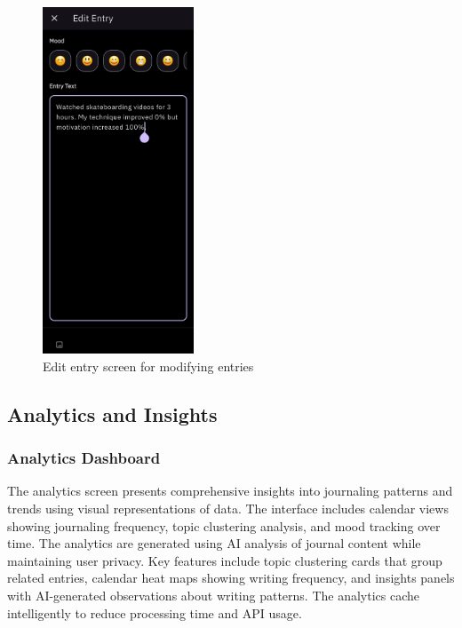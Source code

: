 \begin{figure}[H]
\centering
\includegraphics[width=0.4\textwidth]{files/imgs/prototype/edit_entry_screen.jpeg}
\caption{Edit entry screen for modifying entries}
\label{fig:edit-entry-screen}
\end{figure}

\subsection{Analytics and Insights}

\subsubsection{Analytics Dashboard}

The analytics screen presents comprehensive insights into journaling patterns and trends using visual representations of data. The interface includes calendar views showing journaling frequency, topic clustering analysis, and mood tracking over time. The analytics are generated using AI analysis of journal content while maintaining user privacy. Key features include topic clustering cards that group related entries, calendar heat maps showing writing frequency, and insights panels with AI-generated observations about writing patterns. The analytics cache intelligently to reduce processing time and API usage.

